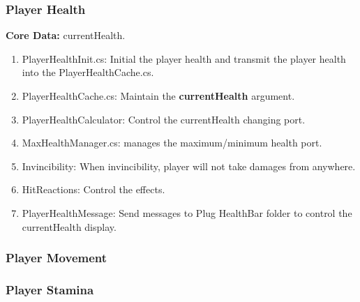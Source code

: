 	\hspace{1.5em}

\subsubsection{Player Health}\label{PlayerHealth}

	\par\hspace{1.5em} \textbf{Core Data:} currentHealth.
\begin{enumerate}
	\item PlayerHealthInit.cs: Initial the player health and transmit the player health into the PlayerHealthCache.cs.
	\item PlayerHealthCache.cs: Maintain the \textbf{currentHealth} argument.
	\item PlayerHealthCalculator: Control the currentHealth changing port.
	\item MaxHealthManager.cs: manages the maximum/minimum health port.
	\item Invincibility: When invincibility, player will not take damages from anywhere.
	\item HitReactions: Control the effects.
	\item PlayerHealthMessage: Send messages to Plug HealthBar folder to control the currentHealth display.
\end{enumerate}

\subsubsection{Player Movement}\label{PlayerMovement}

\subsubsection{Player Stamina}\label{PlayerStamina}